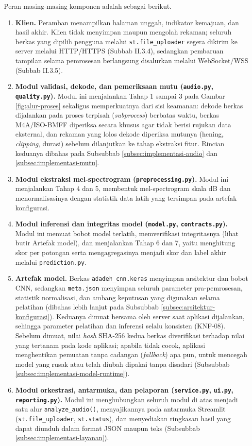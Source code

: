 Peran masing-masing komponen adalah sebagai berikut.

\begin{enumerate}
  \item \textbf{Klien.} Peramban menampilkan halaman unggah, indikator kemajuan, dan
  hasil akhir. Klien tidak menyimpan maupun mengolah rekaman; seluruh berkas yang
  dipilih pengguna melalui \texttt{st.file\_uploader} segera dikirim ke server
  melalui HTTP/HTTPS (Subbab II.3.4), sedangkan pembaruan tampilan selama
  pemrosesan berlangsung disalurkan melalui WebSocket/WSS (Subbab II.3.5).
  \item \textbf{Modul validasi, dekode, dan pemeriksaan mutu
  (\texttt{audio.py}, \texttt{quality.py}).} Modul ini menjalankan Tahap 1
  sampai 3 pada Gambar \ref{fig:alur-proses} sekaligus memperkuatnya dari sisi
  keamanan: dekode berkas dijalankan pada proses terpisah (\textit{subprocess})
  berbatas waktu, berkas M4A/ISO-BMFF diperiksa secara khusus agar tidak berisi
  rujukan data eksternal, dan rekaman yang lolos dekode diperiksa mutunya
  (hening, \textit{clipping}, durasi) sebelum dilanjutkan ke tahap ekstraksi
  fitur. Rincian keduanya dibahas pada Subsubbab \ref{subsec:implementasi-audio}
  dan \ref{subsec:implementasi-mutu}.
  \item \textbf{Modul ekstraksi mel-spectrogram (\texttt{preprocessing.py}).}
  Modul ini menjalankan Tahap 4 dan 5, membentuk mel-spectrogram skala dB dan
  menormalisasinya dengan statistik data latih yang tersimpan pada artefak
  konfigurasi.
  \item \textbf{Modul inferensi dan integritas model (\texttt{model.py},
  \texttt{contracts.py}).} Modul ini memuat bobot model terlatih, memverifikasi
  integritasnya (lihat butir Artefak model), dan menjalankan Tahap 6 dan 7,
  yaitu menghitung skor per potongan serta mengagregasinya menjadi skor dan
  label akhir melalui \texttt{prediction.py}.
  \item \textbf{Artefak model.} Berkas \texttt{adadeh\_cnn.keras} menyimpan
  arsitektur dan bobot CNN, sedangkan \texttt{meta.json} menyimpan seluruh
  parameter pra-pemrosesan, statistik normalisasi, dan ambang keputusan yang
  digunakan selama pelatihan (dibahas lebih lanjut pada Subsubbab
  \ref{subsec:arsitektur-konfigurasi}). Keduanya dimuat bersama oleh server saat
  aplikasi dijalankan, sehingga parameter pelatihan dan inferensi selalu konsisten
  (KNF-08). Sebelum dimuat, nilai \textit{hash} SHA-256 kedua berkas diverifikasi
  terhadap nilai yang tertanam pada kode aplikasi; apabila tidak cocok, aplikasi
  menghentikan pemuatan tanpa cadangan (\textit{fallback}) apa pun, untuk mencegah
  model yang rusak atau telah diubah dipakai tanpa disadari (Subsubbab
  \ref{subsec:implementasi-model-runtime}).
  \item \textbf{Modul orkestrasi, antarmuka, dan pelaporan (\texttt{service.py},
  \texttt{ui.py}, \texttt{reporting.py}).} Modul ini menghubungkan seluruh modul
  di atas menjadi satu alur \texttt{analyze\_audio()}, menyajikannya pada
  antarmuka Streamlit (\texttt{st.file\_uploader}, \texttt{st.status}), dan
  menyediakan ringkasan hasil yang dapat diunduh dalam format JSON maupun teks
  (Subsubbab \ref{subsec:implementasi-layanan}).
\end{enumerate}

